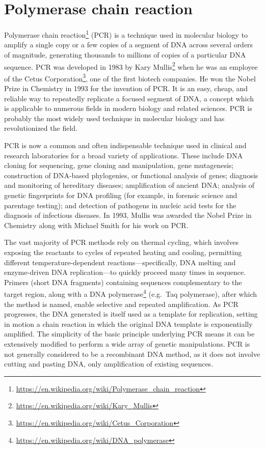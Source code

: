 \documentclass[]{book}
\let\rmarkdownfootnote\footnote%
\def\footnote{\protect\rmarkdownfootnote}
\renewcommand{\href}[2]{#2\footnote{\url{#1}}}
\begin{document}
\section{Polymerase chain reaction}\label{polymerase-chain-reaction}

\href{https://en.wikipedia.org/wiki/Polymerase_chain_reaction}{Polymerase
chain reaction} (PCR) is a technique used in molecular biology to
amplify a single copy or a few copies of a segment of DNA across several
orders of magnitude, generating thousands to millions of copies of a
particular DNA sequence. PCR was developed in 1983 by
\href{https://en.wikipedia.org/wiki/Kary_Mullis}{Kary Mullis} when he
was an employee of the
\href{https://en.wikipedia.org/wiki/Cetus_Corporation}{Cetus
Corporation}, one of the first biotech companies. He won the Nobel Prize
in Chemistry in 1993 for the invention of PCR. It is an easy, cheap, and
reliable way to repeatedly replicate a focused segment of DNA, a concept
which is applicable to numerous fields in modern biology and related
sciences. PCR is probably the most widely used technique in molecular
biology and has revolutionized the field.

PCR is now a common and often indispensable technique used in clinical
and research laboratories for a broad variety of applications. These
include DNA cloning for sequencing, gene cloning and manipulation, gene
mutagenesis; construction of DNA-based phylogenies, or functional
analysis of genes; diagnosis and monitoring of hereditary diseases;
amplification of ancient DNA; analysis of genetic fingerprints for DNA
profiling (for example, in forensic science and parentage testing); and
detection of pathogens in nucleic acid tests for the diagnosis of
infectious diseases. In 1993, Mullis was awarded the Nobel Prize in
Chemistry along with Michael Smith for his work on PCR.

The vast majority of PCR methods rely on thermal cycling, which involves
exposing the reactants to cycles of repeated heating and cooling,
permitting different temperature-dependent reactions---specifically, DNA
melting and enzyme-driven DNA replication---to quickly proceed many
times in sequence. Primers (short DNA fragments) containing sequences
complementary to the target region, along with a
\href{https://en.wikipedia.org/wiki/DNA_polymerase}{DNA polymerase}
(e.g.~Taq polymerase), after which the method is named, enable selective
and repeated amplification. As PCR progresses, the DNA generated is
itself used as a template for replication, setting in motion a chain
reaction in which the original DNA template is exponentially amplified.
The simplicity of the basic principle underlying PCR means it can be
extensively modified to perform a wide array of genetic manipulations.
PCR is not generally considered to be a recombinant DNA method, as it
does not involve cutting and pasting DNA, only amplification of existing
sequences.
\end{document}
